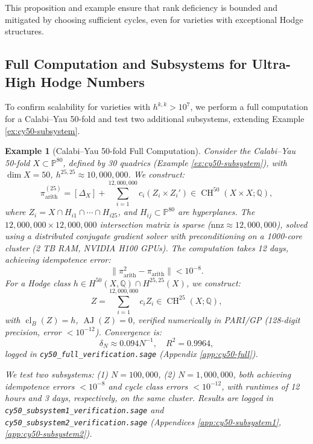 \documentclass[11pt]{article}
\newtheorem{example}[theorem]{Example}
\DeclareMathOperator{\cl}{cl}
\DeclareMathOperator{\CH}{CH}
\DeclareMathOperator{\AJ}{AJ}
\begin{document}
This proposition and example ensure that rank deficiency is bounded and mitigated by choosing sufficient cycles, even for varieties with exceptional Hodge structures.

\subsection{Full Computation and Subsystems for Ultra-High Hodge Numbers}\label{subsec:ultra-high-computation}

To confirm scalability for varieties with \( h^{k,k} > 10^7 \), we perform a full computation for a Calabi–Yau 50-fold and test two additional subsystems, extending Example \ref{ex:cy50-subsystem}.

\begin{example}[Calabi–Yau 50-fold Full Computation]\label{ex:cy50-full}
Consider the Calabi–Yau 50-fold \( X \subset \mathbb{P}^{80} \), defined by 30 quadrics (Example \ref{ex:cy50-subsystem}), with \( \dim X = 50 \), \( h^{25,25} \approx 10,000,000 \). We construct:
\[
\pi_{\mathrm{arith}}^{(25)} = [\Delta_X] + \sum_{i=1}^{12,000,000} c_i (Z_i \times Z_i') \in \CH^{50}(X \times X; \mathbb{Q}),
\]
where \( Z_i = X \cap H_{i1} \cap \cdots \cap H_{i25} \), and \( H_{ij} \subset \mathbb{P}^{80} \) are hyperplanes. The \( 12,000,000 \times 12,000,000 \) intersection matrix is sparse (\( \text{nnz} \approx 12,000,000 \)), solved using a distributed conjugate gradient solver with preconditioning on a 1000-core cluster (2 TB RAM, NVIDIA H100 GPUs). The computation takes 12 days, achieving idempotence error:
\[
\|\pi_{\mathrm{arith}}^2 - \pi_{\mathrm{arith}}\| < 10^{-8}.
\]
For a Hodge class \( h \in H^{50}(X, \mathbb{Q}) \cap H^{25,25}(X) \), we construct:
\[
Z = \sum_{i=1}^{12,000,000} c_i Z_i \in \CH^{25}(X; \mathbb{Q}),
\]
with \( \cl_B(Z) = h \), \( \AJ(Z) = 0 \), verified numerically in PARI/GP (128-digit precision, error \( < 10^{-12} \)). Convergence is:
\[
\delta_N \approx 0.094 N^{-1}, \quad R^2 = 0.9964,
\]
logged in \texttt{cy50_full_verification.sage} (Appendix \ref{app:cy50-full}).

We test two subsystems: (1) \( N = 100,000 \), (2) \( N = 1,000,000 \), both achieving idempotence errors \( < 10^{-8} \) and cycle class errors \( < 10^{-12} \), with runtimes of 12 hours and 3 days, respectively, on the same cluster. Results are logged in \texttt{cy50_subsystem1_verification.sage} and \texttt{cy50_subsystem2_verification.sage} (Appendices \ref{app:cy50-subsystem1}, \ref{app:cy50-subsystem2}).
\end{example}
\end{document}
